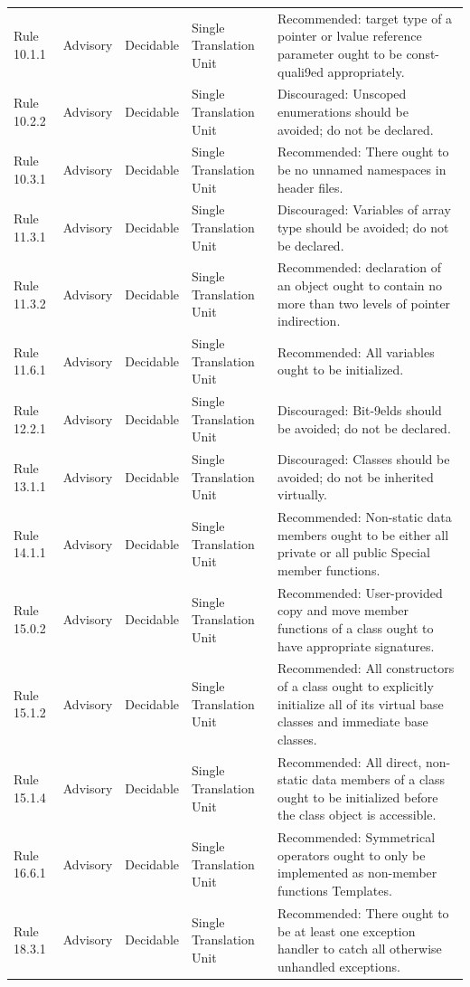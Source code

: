 \documentclass[11pt]{article}
\begin{document}
{\begin{longtable}{@{}P{2.2cm}P{1.7cm}P{2.1cm}P{3.0cm}P{6.7cm}@{}}
Rule 10.1.1 & Advisory & Decidable & Single Translation Unit & Recommended: target type of a pointer or lvalue reference parameter ought to be const-quali9ed appropriately. \\
Rule 10.2.2 & Advisory & Decidable & Single Translation Unit & Discouraged: Unscoped enumerations should be avoided; do not be declared. \\
Rule 10.3.1 & Advisory & Decidable & Single Translation Unit & Recommended: There ought to be no unnamed namespaces in header files. \\
Rule 11.3.1 & Advisory & Decidable & Single Translation Unit & Discouraged: Variables of array type should be avoided; do not be declared. \\
Rule 11.3.2 & Advisory & Decidable & Single Translation Unit & Recommended: declaration of an object ought to contain no more than two levels of pointer indirection. \\
Rule 11.6.1 & Advisory & Decidable & Single Translation Unit & Recommended: All variables ought to be initialized. \\
Rule 12.2.1 & Advisory & Decidable & Single Translation Unit & Discouraged: Bit-9elds should be avoided; do not be declared. \\
Rule 13.1.1 & Advisory & Decidable & Single Translation Unit & Discouraged: Classes should be avoided; do not be inherited virtually. \\
Rule 14.1.1 & Advisory & Decidable & Single Translation Unit & Recommended: Non-static data members ought to be either all private or all public Special member functions. \\
Rule 15.0.2 & Advisory & Decidable & Single Translation Unit & Recommended: User-provided copy and move member functions of a class ought to have appropriate signatures. \\
Rule 15.1.2 & Advisory & Decidable & Single Translation Unit & Recommended: All constructors of a class ought to explicitly initialize all of its virtual base classes and immediate base classes. \\
Rule 15.1.4 & Advisory & Decidable & Single Translation Unit & Recommended: All direct, non-static data members of a class ought to be initialized before the class object is accessible. \\
Rule 16.6.1 & Advisory & Decidable & Single Translation Unit & Recommended: Symmetrical operators ought to only be implemented as non-member functions Templates. \\
Rule 18.3.1 & Advisory & Decidable & Single Translation Unit & Recommended: There ought to be at least one exception handler to catch all otherwise unhandled exceptions. \\

\end{longtable}}
\end{document}
